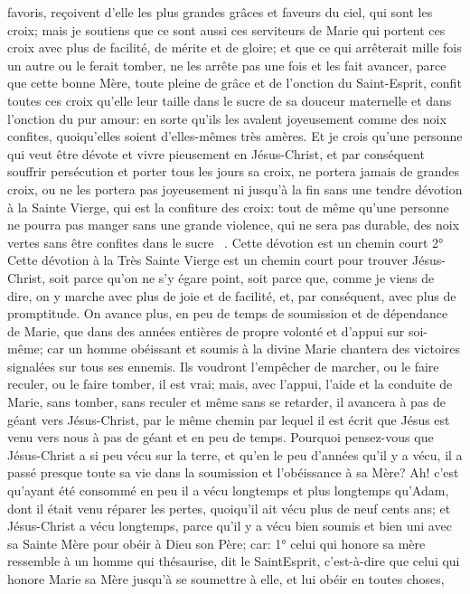 favoris, reçoivent d'elle les plus grandes grâces et faveurs du ciel, qui sont les croix; mais je soutiens que ce sont
aussi ces serviteurs de Marie qui portent ces croix avec plus de facilité, de mérite et de gloire; et que ce qui
arrêterait mille fois un autre ou le ferait tomber, ne les arrête pas une fois et les fait avancer, parce que cette bonne
Mère, toute pleine de grâce et de l'onction du Saint-Esprit, confit toutes ces croix qu'elle leur taille dans le sucre de
sa douceur maternelle et dans l'onction du pur amour: en sorte qu'ils les avalent joyeusement comme des noix
confites, quoiqu'elles soient d'elles-mêmes très amères. Et je crois qu'une personne qui veut être dévote et vivre
pieusement en Jésus-Christ, et par conséquent souffrir persécution et porter tous les jours sa croix, ne portera
jamais de grandes croix, ou ne les portera pas joyeusement ni jusqu'à la fin sans une tendre dévotion à la Sainte
Vierge, qui est la confiture des croix: tout de même qu'une personne ne pourra pas manger sans une grande
violence, qui ne sera pas durable, des noix vertes sans être confites dans le sucre ~.
Cette dévotion est un chemin court
 2° Cette dévotion à la Très Sainte Vierge est un chemin court pour trouver Jésus-Christ, soit parce qu'on ne
s'y égare point, soit parce que, comme je viens de dire, on y marche avec plus de joie et de facilité, et, par
conséquent, avec plus de promptitude. On avance plus, en peu de temps de soumission et de dépendance de
Marie, que dans des années entières de propre volonté et d'appui sur soi-même; car un homme obéissant et
soumis à la divine Marie chantera des victoires signalées sur tous ses ennemis. Ils voudront l'empêcher de
marcher, ou le faire reculer, ou le faire tomber, il est vrai; mais, avec l'appui, l'aide et la conduite de Marie, sans
tomber, sans reculer et même sans se retarder, il avancera à pas de géant vers Jésus-Christ, par le même chemin
par lequel il est écrit que Jésus est venu vers nous à pas de géant et en peu de temps.
 Pourquoi pensez-vous que Jésus-Christ a si peu vécu sur la terre, et qu'en le peu d'années qu'il y a vécu, il a
passé presque toute sa vie dans la soumission et l'obéissance à sa Mère? Ah! c'est qu'ayant été consommé en
peu il a vécu longtemps et plus longtemps qu'Adam, dont il était venu réparer les pertes, quoiqu'il ait vécu plus de
neuf cents ans; et Jésus-Christ a vécu longtemps, parce qu'il y a vécu bien soumis et bien uni avec sa Sainte Mère
pour obéir à Dieu son Père; car: 1° celui qui honore sa mère ressemble à un homme qui thésaurise, dit le SaintEsprit, c'est-à-dire que celui qui honore Marie sa Mère jusqu'à se soumettre à elle, et lui obéir en toutes choses,
